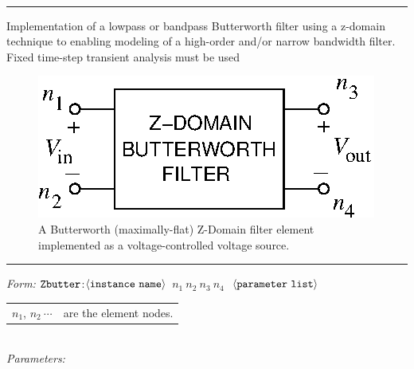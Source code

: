 \documentclass{article}
\begin{document}
\\
\normalsize
\newline
\rule{\textwidth}{0.5mm}

\noindent
Implementation of a lowpass or bandpass Butterworth filter using a z-domain technique to enabling modeling of a high-order and/or narrow bandwidth filter.  Fixed time-step transient analysis must be used

\begin{figure}[H]
\centerline{\includegraphics{figures/zbutter.eps}}
\caption{A Butterworth (maximally-flat) Z-Domain filter element implemented as a voltage-controlled voltage source.}
\end{figure}

\noindent
\rule{\textwidth}{0.5mm}
\newline
\textit{Form:}
\newline
$\tt Zbutter$:$\langle \tt{instance\ name}\rangle$ $n_1\ n_2\ n_3\ n_4\ $
$\langle \tt{parameter\ list}\rangle$
\newline
\begin{tabular}{r l}
$n_1$, $n_2\ \cdots$ & are the element nodes. \\
\end{tabular}\\[0.05in]

\noindent
\textit{Parameters:}\\[0.05in]
\end{document}
